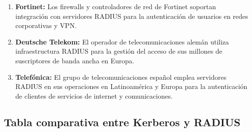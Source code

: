 \documentclass[letterpaper,12pt]{article}
\begin{document}
\begin{enumerate}[leftmargin=2cm]
  \item \textbf{Fortinet:} Los firewalls y controladores de red de Fortinet soportan integraci\'on con servidores RADIUS para la autenticaci\'on de usuarios en redes corporativas y VPN.

  \item \textbf{Deutsche Telekom:} El operador de telecomunicaciones alem\'an utiliza infraestructura RADIUS para la gesti\'on del acceso de sus millones de suscriptores de banda ancha en Europa.

  \item \textbf{Telef\'onica:} El grupo de telecomunicaciones espa\~nol emplea servidores RADIUS en sus operaciones en Latinoam\'erica y Europa para la autenticaci\'on de clientes de servicios de internet y comunicaciones.
\end{enumerate}

\subsection{Tabla comparativa entre Kerberos y RADIUS}
\newpage
\end{document}
